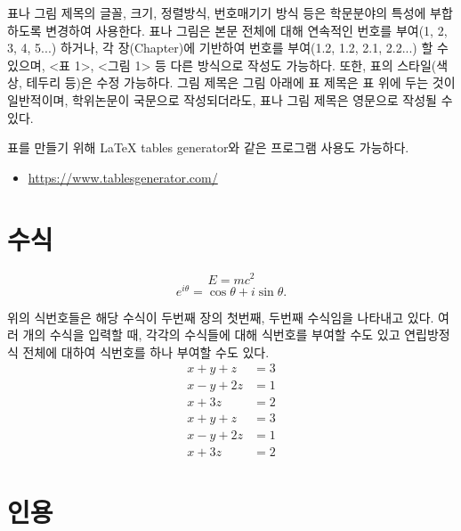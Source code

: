 표나 그림 제목의 글꼴, 크기, 정렬방식, 번호매기기 방식 등은 학문분야의 특성에 부합하도록 변경하여 사용한다. 표나 그림은 본문 전체에 대해 연속적인 번호를 부여(1, 2, 3, 4, 5...) 하거나, 각 장(Chapter)에 기반하여 번호를 부여(1.2, 1.2, 2.1, 2.2...) 할 수 있으며, <표 1>, <그림 1> 등 다른 방식으로 작성도 가능하다. 또한, 표의 스타일(색상, 테두리 등)은 수정 가능하다. 그림 제목은 그림 아래에 표 제목은 표 위에 두는 것이 일반적이며, 학위논문이 국문으로 작성되더라도, 표나 그림 제목은 영문으로 작성될 수 있다. \par

\bigskip

표를 만들기 위해 LaTeX tables generator와 같은 프로그램 사용도 가능하다. \par
\begin{itemize}
\item
\url{https://www.tablesgenerator.com/}
\end{itemize}



\section{수식}\label{sec:equation}

\begin{equation}
E=mc^2
\end{equation}
\begin{equation}
e^{i\theta}=\cos\theta+i\sin\theta.
\end{equation}

위의 식번호들은 해당 수식이 두번째 장의 첫번째, 두번째 수식임을 나타내고 있다. 여러 개의 수식을 입력할 때, 각각의 수식들에 대해 식번호를 부여할 수도 있고 연립방정식 전체에 대하여 식번호를 하나 부여할 수도 있다.
\begin{align}
x+y+z&=3\\
x-y+2z&=1\\
x+3z&=2
\end{align}
\begin{equation}
\begin{aligned}
x+y+z&=3\\
x-y+2z&=1\\
x+3z&=2
\end{aligned}
\end{equation}

\section{인용} \label{sec:quotation}

